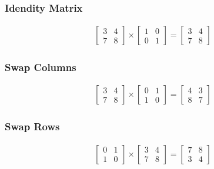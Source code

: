 \documentclass[12pt, a4paper]{article}
\begin{document}
\subsubsection{Idendity Matrix}

\begin{gather}
  \begin{bmatrix}
   3 & 4 \\
   7 & 8 
  \end{bmatrix}
  \times
  \begin{bmatrix}
   1 & 0 \\
   0 & 1 
  \end{bmatrix}
  =
  \begin{bmatrix}
   3 & 4 \\
   7 & 8 
  \end{bmatrix}
\end{gather}

\subsubsection{Swap Columns}
\begin{gather}
  \begin{bmatrix}
   3 & 4 \\
   7 & 8 
  \end{bmatrix}
  \times
  \begin{bmatrix}
   0 & 1 \\
   1 & 0 
  \end{bmatrix}
  =
  \begin{bmatrix}
   4 & 3 \\
   8 & 7 
  \end{bmatrix}
\end{gather}

\subsubsection{Swap Rows}
\begin{gather}
  \begin{bmatrix}
   0 & 1 \\
   1 & 0 
  \end{bmatrix}
  \times
  \begin{bmatrix}
   3 & 4 \\
   7 & 8 
  \end{bmatrix}
  =
  \begin{bmatrix}
   7 & 8 \\
   3 & 4 
  \end{bmatrix}
\end{gather}
\end{document}
